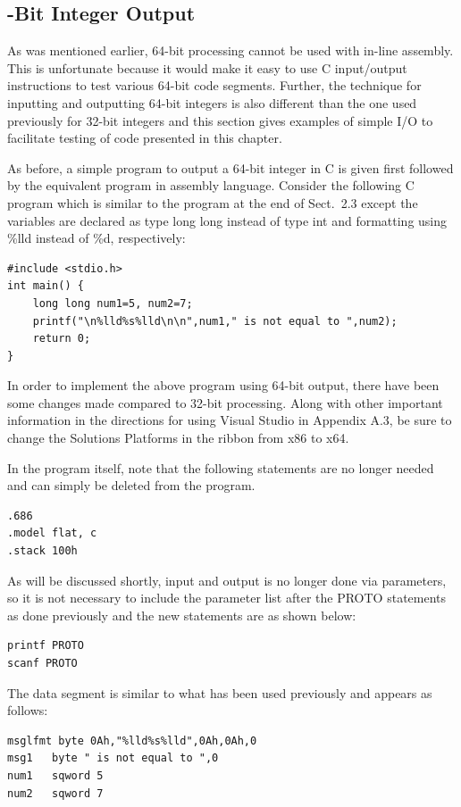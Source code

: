 \documentclass[10pt]{book}
\begin{document}
\subsection{-Bit Integer Output}
As was mentioned earlier, 64-bit processing cannot be used with in-line assembly. This is unfortunate because it would make it easy to use C input/output instructions to test various 64-bit code segments. Further, the technique for inputting and outputting 64-bit integers is also different than the one used previously for 32-bit integers and this section gives examples of simple I/O to facilitate testing of code presented in this chapter.

As before, a simple program to output a 64-bit integer in C is given first followed by the equivalent program in assembly language. Consider the following C program which is similar to the program at the end of Sect.~2.3 except the variables are declared as type long long instead of type int and formatting using \%lld instead of \%d, respectively:
\begin{verbatim}
#include <stdio.h>
int main() {
    long long num1=5, num2=7;
    printf("\n%lld%s%lld\n\n",num1," is not equal to ",num2);
    return 0;
}
\end{verbatim}

In order to implement the above program using 64-bit output, there have been some changes made compared to 32-bit processing. Along with other important information in the directions for using Visual Studio in Appendix A.3, be sure to change the Solutions Platforms in the ribbon from x86 to x64.

In the program itself, note that the following statements are no longer needed and can simply be deleted from the program.
\begin{verbatim}
.686
.model flat, c
.stack 100h
\end{verbatim}

As will be discussed shortly, input and output is no longer done via parameters, so it is not necessary to include the parameter list after the PROTO statements as done previously and the new statements are as shown below:
\begin{verbatim}
printf PROTO
scanf PROTO
\end{verbatim}

The data segment is similar to what has been used previously and appears as follows:
\begin{verbatim}
msglfmt byte 0Ah,"%lld%s%lld",0Ah,0Ah,0
msg1   byte " is not equal to ",0
num1   sqword 5
num2   sqword 7
\end{verbatim}
\end{document}
